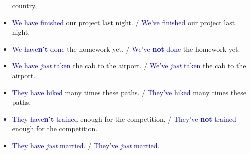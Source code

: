 \begin{multicols}{2}
\begin{itemize}
country.
\item \textcolor{blue}{We have finished} our project last night. / \textcolor{blue}{We've finished} our project last night.
\item \textcolor{blue}{We have\textbf{n't} done} the homework yet. / \textcolor{blue}{We've \textbf{not} done} the homework yet.
\item \textcolor{blue}{We have \emph{just} taken} the cab to the airport. / \textcolor{blue}{We've \emph{just} taken} the cab to the airport.

\item \textcolor{blue}{They have hiked} many times these paths. / \textcolor{blue}{They've hiked} many times these paths.
\item \textcolor{blue}{They have\textbf{n't} trained} enough for the competition. / \textcolor{blue}{They've \textbf{not} trained} enough for the competition.
\item \textcolor{blue}{They have \emph{just} married}. / \textcolor{blue}{They've \emph{just} married}.

\end{itemize}
\end{multicols}

